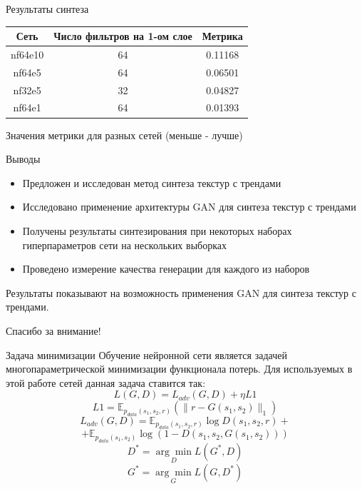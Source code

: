 \documentclass[12pt]{beamer}
\begin{document}
	\begin{frame}{Результаты синтеза}
		\begin{table}
			\begin{center}
				\begin{tabular}{|c|c|c|}
					\hline
					Сеть & Число фильтров на 1-ом слое & Метрика \\
					\hline
					nf64e10 & 64& 0.11168\\
					\hline
					nf64e5 & 64 & 0.06501\\
					\hline
					nf32e5 & 32 & 0.04827\\
					\hline
					nf64e1 & 64 & 0.01393\\
					\hline
				\end{tabular}
				\vfill
				Значения метрики для разных сетей (меньше - лучше)
			\end{center}
		\end{table}
	\end{frame}
	
	\begin{frame}{Выводы}
		\begin{itemize}
			\item Предложен и исследован метод синтеза текстур с трендами
			\item Исследовано применение архитектуры GAN для синтеза текстур с трендами
			\item Получены результаты синтезирования при некоторых наборах гиперпараметров сети на нескольких выборках
			\item Проведено измерение качества генерации для каждого из наборов
		\end{itemize}
		Результаты показывают на возможность применения GAN для синтеза текстур с трендами.
	\end{frame}
	
	\begin{frame}
		\centering\huge{Спасибо за внимание!}
	\end{frame}
	
	\begin{frame}{Задача минимизации}
		Обучение нейронной сети является задачей многопараметрической минимизации функционала потерь. Для используемых в этой работе сетей данная задача ставится так:
		 $$ L(G, D) = L_{adv}(G, D) + \eta L1$$
		 $$L1 = \mathbb{E}_{p_{data}(s_1, s_2, r)} (\parallel r - G(s_1, s_2) \parallel_1)$$
		 $$ L_{adv}(G, D) = \mathbb{E}_{p_{data}(s_1, s_2, r)}\log D(s_1, s_2, r)+ $$
		 $$ +  \mathbb{E}_{p_{data}(s_1, s_2)} \log (1 - D(s_1, s_2, G(s_1, s_2))) $$
		 $$ D^* = \underset{D}{\arg\min} L(G^*, D)  $$
		 $$ G^* = \underset{G}{\arg\min} L(G, D^*)  $$
	\end{frame}
	
\end{document}
